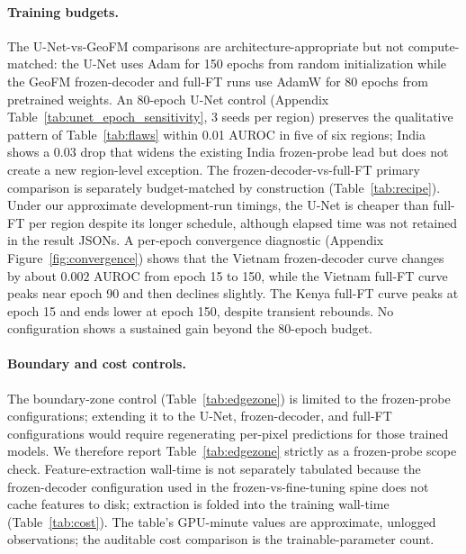 \documentclass{article}
\begin{document}
\paragraph{Training budgets.} The U-Net-vs-GeoFM comparisons are
architecture-appropriate but not compute-matched: the U-Net uses Adam for 150 epochs
from random initialization while the GeoFM frozen-decoder and full-FT runs use AdamW
for 80 epochs from pretrained weights. An 80-epoch U-Net control (Appendix
Table~\ref{tab:unet_epoch_sensitivity}, 3 seeds per region) preserves the qualitative
pattern of Table~\ref{tab:flaws} within 0.01 AUROC in five of six regions; India
shows a $0.03$ drop that widens the existing India frozen-probe lead but does not
create a new region-level exception. The frozen-decoder-vs-full-FT primary comparison
is separately budget-matched by construction (Table~\ref{tab:recipe}). Under
our approximate development-run timings, the U-Net is cheaper than full-FT per
region despite its longer schedule, although elapsed time was not retained in the
result JSONs. A per-epoch
convergence diagnostic (Appendix Figure~\ref{fig:convergence}) shows that the Vietnam
frozen-decoder curve changes by about $0.002$ AUROC from epoch 15 to 150, while the
Vietnam full-FT curve peaks near epoch 90 and then declines slightly. The Kenya full-FT
curve peaks at epoch 15 and ends lower at epoch 150, despite transient rebounds. No
configuration shows a sustained gain beyond the 80-epoch budget.

\paragraph{Boundary and cost controls.} The boundary-zone control
(Table~\ref{tab:edgezone}) is limited to
the frozen-probe configurations; extending it to the U-Net, frozen-decoder, and
full-FT configurations would require regenerating per-pixel predictions for those
trained models. We therefore report Table~\ref{tab:edgezone} strictly as a
frozen-probe scope check. Feature-extraction wall-time is not separately tabulated
because the frozen-decoder configuration used in the frozen-vs-fine-tuning spine does
not cache features to disk; extraction is folded into the training wall-time
(Table~\ref{tab:cost}). The table's GPU-minute values are approximate, unlogged
observations; the auditable cost comparison is the trainable-parameter count.
\end{document}
